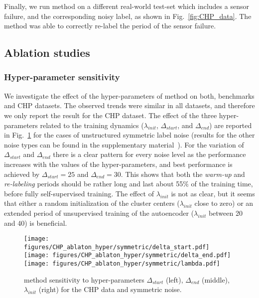 \documentclass[runningheads, envcountsame, a4paper]{llncs}
\begin{document}
Finally, we run \acrshort{method} on a different real-world test-set which includes a  sensor failure, and the corresponding noisy label, as shown in Fig.\ \ref{fig:CHP_data}.
The method was able to correctly re-label the period of the sensor failure.


\subsection{Ablation studies}

\subsubsection{Hyper-parameter sensitivity}
We investigate the effect of the hyper-parameters of \acrshort{method} on both, benchmarks and CHP datasets. 
The observed trends were similar in all datasets, and therefore we only report the result for the CHP dataset.
The effect of the three hyper-parameters related to the training dynamics ($\lambda_{init}$, $\Delta_{start}$, and $\Delta_{end}$) are reported in Fig.~\ref{fig:ablaton_hyper_symm} for the cases of unstructured symmetric label noise (results for the other noise types can be found in the supplementary material~\cite{castellaniSuppl2021}).
For the variation of $\Delta_{start}$  and $\Delta_{end}$ there is a clear pattern for every noise level as the performance increases with the values of the hyper-parameters, and best performance is achieved by  $\Delta_{start}=25$  and $\Delta_{end}=30$.
This shows that both the \textit{warm-up} and \textit{re-labeling} periods should be rather long and last about 55\% of the training time, before fully self-supervised training.
The effect of  $\lambda_{init}$ is not as clear, but it seems that either a random 
initialization of the cluster centers ($\lambda_{init}$ close to zero)
or an extended period of unsupervised training of the autoencoder ($\lambda_{init}$ between 20 and 40) is beneficial.

\begin{figure}[tb]
        \centering
        \texttt{[image: figures/CHP\_ablaton\_hyper/symmetric/delta\_start.pdf]}
        \texttt{[image: figures/CHP\_ablaton\_hyper/symmetric/delta\_end.pdf]}
        \texttt{[image: figures/CHP\_ablaton\_hyper/symmetric/lambda.pdf]}
      \caption{
      \acrshort{method} sensitivity to hyper-parameters $\Delta_{start}$ (left), $\Delta_{end}$ (middle), $\lambda_{init}$ (right) for the  CHP data and symmetric noise.}
        \label{fig:ablaton_hyper_symm}
\end{figure}
\end{document}
